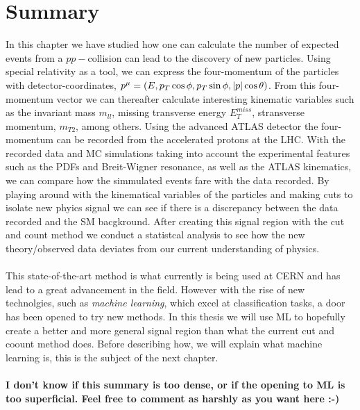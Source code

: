 \documentclass[14pt, a4paper]{book}
\begin{document}
\section{Summary}
In this chapter we have studied how one can calculate the number of expected events from a $pp-$collision can lead to the discovery of new particles. Using special relativity as a tool, we can express the four-momentum of the particles with 
detector-coordinates, $p^\mu=(E,p_T\cos\phi,p_T\sin\phi,\abs{p}\cos\theta)$. From this four-momentum vector we can thereafter calculate interesting kinematic variables such as the invariant mass $m_{ll}$, missing transverse energy $E_T^{miss}$, 
stransverse momentum, $m_{T2}$, among others. Using the advanced ATLAS detector the four-momentum can be recorded from the accelerated protons at the LHC. With the recorded data and MC simulations taking into account the experimental features such as 
the PDFs and Breit-Wigner resonance, as well as the ATLAS kinematics, we can compare how the simmulated events fare with the data recorded. By playing around with the kinematical variables of the particles and making cuts to isolate new phyics signal 
we can see if there is a discrepancy between the data recorded and the SM bacgkround. After creating this signal region with the cut and count method we conduct a statistcal analysis to see how the new theory/observed data deviates from our 
current understanding of physics.\\
\\This state-of-the-art method is what currently is being used at CERN and has lead to a great advancement in the field. However with the rise of new technolgies, such as \textit{machine learning}, which excel at classification tasks, a door has been 
opened to try new methods. In this thesis we will use ML to hopefully create a better and more general signal region than what the current cut and coount method does. Before describing how, we will explain what machine learning is, this is the subject 
of the next chapter.\\
\\\textbf{I don't know if this summary is too dense, or if the opening to ML is too superficial. Feel free to comment as harshly as you want here :-)}
\end{document}
